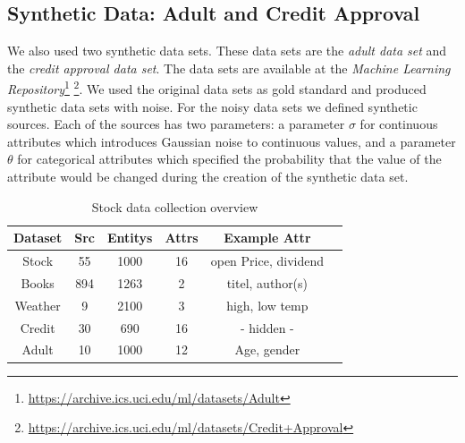 \documentclass{acm_proc_article-sp}
\begin{document}
\subsection{Synthetic Data: Adult and Credit Approval}

We also used two synthetic data sets. These data sets are the \emph{adult data set} and the \emph{credit approval data set}. The data sets are available at the \emph{Machine Learning Repository}\footnote{\url{https://archive.ics.uci.edu/ml/datasets/Adult}}
\footnote{\url{https://archive.ics.uci.edu/ml/datasets/Credit+Approval}}. We used the original data sets as gold standard and produced synthetic data sets with noise. For the noisy data sets we defined synthetic sources. Each of the sources has two parameters: a parameter $\sigma$ for continuous attributes which introduces Gaussian noise to continuous values, and a parameter $\theta$ for categorical attributes which specified the probability that the value of the attribute would be changed during the creation of the synthetic data set. 

\begin{table}[h] 
    \centering
{%
\begin{tabular}{  | c | c | c | c  | c | c |}		
\hline
\textbf{Dataset} & \textbf{Src} &  \textbf{Entitys} & \textbf{Attrs}  & \textbf{Example Attr}  \\
\hline
 Stock & 55 &   1000 & 16 &  open Price, dividend   \\
 Books & 894 &   1263 & 2 &  titel, author(s)   \\
 Weather & 9 &   2100 & 3 &  high, low temp   \\
 Credit & 30 &   690 & 16 &  - hidden -   \\
 Adult & 10 &   1000 & 12 &  Age, gender   \\
\hline
\end{tabular}
}
 \caption{Stock data collection overview}%
    \label{fig:stock}%
\end{table}
\end{document}
